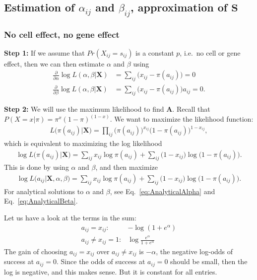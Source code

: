 \documentclass[12pt]{article}
\begin{document}
\subsection{Estimation of $\alpha_{ij}$ and $\beta_{ij}$, approximation of $\mathbf{S}$} %

\subsubsection*{No cell effect, no gene effect} %

{\bf Step 1:} If we assume that $Pr(X_{ij} = s_{ij})$ is a constant $p$, i.e.\ no cell or gene effect, then we can then estimate $\alpha$ and $\beta$ using
\begin{align} \label{eq:AlphaBeta}
  \frac{\partial}{\partial \alpha} \log L(\alpha, \beta|\mathbf{X}) &= \sum_{i j} \big (x_{i j} - \pi(a_{ij}) \big) = 0 \\
  \frac{\partial}{\partial \beta} \log L(\alpha, \beta|\mathbf{X}) &= \sum_{i j} \big (x_{i j} - \pi(a_{ij}) \big )a_{ij} = 0. \nonumber
\end{align}

{\bf Step 2:} We will use the maximum likelihood to find $\mathbf{A}$. 
Recall that $P(X = x|\pi) = \pi^x (1 - \pi)^{(1-x)}$.
We want to maximize the likelihood function:
\begin{align}
  L \big (\pi(a_{ij})|\mathbf{X} \big ) =\prod_{i j}  \big ( \pi(a_{ij}) \big )^{x_{ij}} \big ( 1 - \pi(a_{ij}) \big) ^{1 - x_{ij}},
\end{align}
which is equivalent to maximizing the log likelihood
\begin{align}
  \log L \big (\pi(a_{ij})|\mathbf{X} \big ) =\sum_{i j}x_{ij} \log  \pi(a_{ij})+ \sum_{i j} \big (1 - x_{ij} \big)\log  \big ( 1 - \pi(a_{ij}) \big).
\end{align}
This is done by using $\alpha$ and $\beta$, and then maximize
\begin{align}
  \log L \big (a_{ij}|\mathbf{X}, \alpha, \beta \big ) =\sum_{i j}x_{ij} \log  \pi(a_{ij})+ \sum_{i j} \big (1 - x_{ij} \big)\log  \big ( 1 - \pi(a_{ij}) \big).
\end{align}
For analytical solutions to $\alpha$ and $\beta$, see Eq.~\ref{eq:AnalyticalAlpha} and  Eq.~\ref{eq:AnalyticalBeta}.

Let us have a look at the terms in the sum:
\begin{align}
 a_{ij} = x_{ij}: & -\log(1 + e^{\alpha}) \\
 a_{ij} \neq x_{ij} = 1: &\log \frac{e^{\alpha}}{1 + e^{\alpha}} \nonumber
\end{align}
The gain of choosing $a_{ij} = x_{ij}$ over $ a_{ij} \neq x_{ij}$ is $-\alpha$, the negative log-odds of success at $a_{ij} = 0$.
Since the odds of success at $a_{ij} =0$ should be small, then the log is negative, and this makes sense.
But it is constant for all entries.
\end{document}
